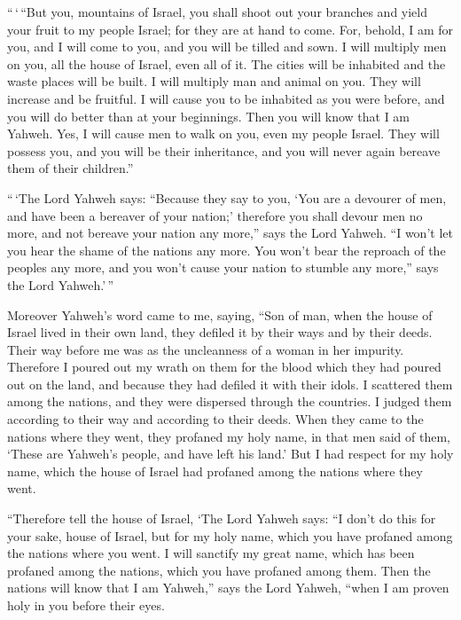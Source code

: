  ``\,`\,``But you, mountains of Israel, you shall shoot
out your branches and yield your fruit to my people Israel; for they are
at hand to come.  For, behold, I am for you, and I will
come to you, and you will be tilled and sown.  I will
multiply men on you, all the house of Israel, even all of it. The cities
will be inhabited and the waste places will be built.  I
will multiply man and animal on you. They will increase and be fruitful.
I will cause you to be inhabited as you were before, and you will do
better than at your beginnings. Then you will know that I am Yahweh.
 Yes, I will cause men to walk on you, even my people
Israel. They will possess you, and you will be their inheritance, and
you will never again bereave them of their children.''

 ``\,`The Lord Yahweh says: ``Because they say to you,
`You are a devourer of men, and have been a bereaver of your nation;'
 therefore you shall devour men no more, and not bereave
your nation any more,'' says the Lord Yahweh.  ``I won't
let you hear the shame of the nations any more. You won't bear the
reproach of the peoples any more, and you won't cause your nation to
stumble any more,'' says the Lord Yahweh.'\,''

 Moreover Yahweh's word came to me, saying,
 ``Son of man, when the house of Israel lived in their
own land, they defiled it by their ways and by their deeds. Their way
before me was as the uncleanness of a woman in her impurity.
 Therefore I poured out my wrath on them for the blood
which they had poured out on the land, and because they had defiled it
with their idols.  I scattered them among the nations,
and they were dispersed through the countries. I judged them according
to their way and according to their deeds.  When they
came to the nations where they went, they profaned my holy name, in that
men said of them, `These are Yahweh's people, and have left his land.'
 But I had respect for my holy name, which the house of
Israel had profaned among the nations where they went.

 ``Therefore tell the house of Israel, `The Lord Yahweh
says: ``I don't do this for your sake, house of Israel, but for my holy
name, which you have profaned among the nations where you went.
 I will sanctify my great name, which has been profaned
among the nations, which you have profaned among them. Then the nations
will know that I am Yahweh,'' says the Lord Yahweh, ``when I am proven
holy in you before their eyes.

